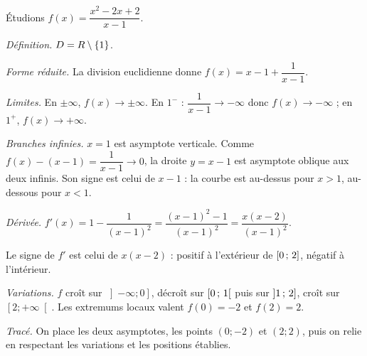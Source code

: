 \begin{exemple}
Étudions $f(x) = \dfrac{x^{2}-2x+2}{x-1}$.

\emph{Définition.} $D = R \setminus \{1\}$.

\emph{Forme réduite.} La division euclidienne donne
$f(x) = x-1+\dfrac{1}{x-1}$.

\emph{Limites.} En $\pm\infty$, $f(x) \to \pm\infty$. En $1^{-}$ :
$\dfrac{1}{x-1} \to -\infty$ donc $f(x) \to -\infty$ ; en $1^{+}$,
$f(x) \to +\infty$.

\emph{Branches infinies.} $x=1$ est asymptote verticale. Comme
$f(x)-(x-1) = \dfrac{1}{x-1} \to 0$, la droite $y = x-1$ est asymptote
oblique aux deux infinis. Son signe est celui de $x-1$ : la courbe est
au-dessus pour $x>1$, au-dessous pour $x<1$.

\emph{Dérivée.} $f'(x) = 1 - \dfrac{1}{(x-1)^{2}} = \dfrac{(x-1)^{2}-1}{(x-1)^{2}}
= \dfrac{x(x-2)}{(x-1)^{2}}$.

Le signe de $f'$ est celui de $x(x-2)$ : positif à l'extérieur de
$\left[0\,;\,2\right]$, négatif à l'intérieur.

\emph{Variations.} $f$ croît sur $\left]-\infty ; 0\right]$, décroît sur
$\left[0\,;\,1\right[$ puis sur $\left]1\,;\,2\right]$, croît sur
$\left[2 ; +\infty\right[$. Les extremums locaux valent $f(0) = -2$ et
$f(2) = 2$.

\emph{Tracé.} On place les deux asymptotes, les points $(0;-2)$ et $(2;2)$,
puis on relie en respectant les variations et les positions établies.
\end{exemple}


